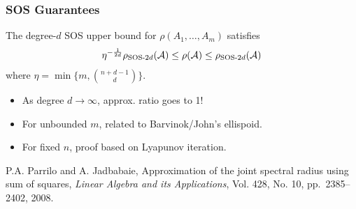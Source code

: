 \documentclass{beamer}
\begin{document}
  \begin{frame}
      \frametitle{SOS Guarantees}
      The degree-$d$ SOS upper bound for $\rho(A_1, \ldots,A_m)$ satisfies
      \[ \eta^{-\frac{1}{2d}} \rho_{\text{SOS-}2d}(\mathcal{A}) \leq \rho(\mathcal{A}) \leq \rho_{\text{SOS-}2d}(\mathcal{A}) \]
      where $\eta = \min\Big\{m, {n+d-1 \choose d}\Big\}$.
      \begin{itemize}
          \item As degree $d \to \infty$, approx. ratio goes to 1!
          \item For unbounded $m$, related to Barvinok/John's ellispoid.
          \item For fixed $n$, proof based on Lyapunov iteration.
      \end{itemize}
      \vfill
      {\scriptsize
      P.A. Parrilo and A. Jadbabaie,
      Approximation of the joint spectral radius using sum of squares,
      \emph{Linear Algebra and its Applications},
      Vol. 428, No. 10, pp.~2385--2402, 2008.
      }
  \end{frame}
\end{document}
